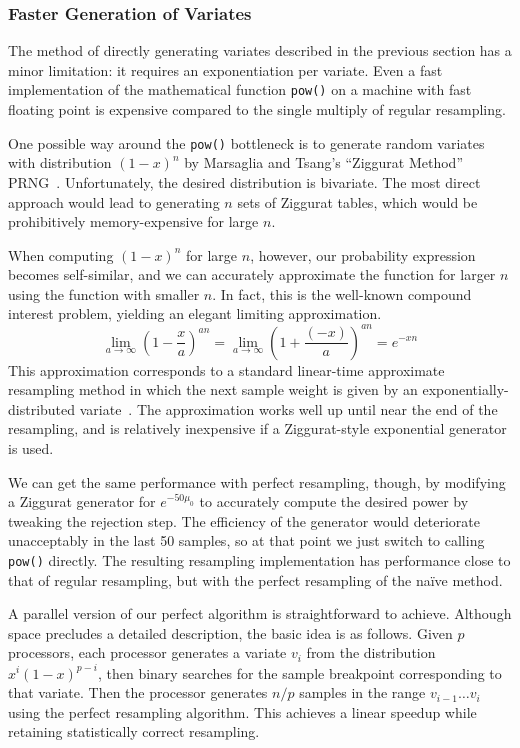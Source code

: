 \documentclass[12pt]{article}
\begin{document}
\subsubsection{Faster Generation of Variates}

  The method of directly generating variates described in the
  previous section has a minor limitation: it requires an
  exponentiation per variate.  Even a fast implementation of
  the mathematical function {\tt pow()} on a machine with
  fast floating point is expensive compared to the single
  multiply of regular resampling.

  One possible way around the {\tt pow()} bottleneck is to generate
  random variates with distribution $(1 - x)^n$ by
  Marsaglia and
  Tsang's ``Ziggurat Method'' PRNG~\cite{ziggurat,ziggurat-fixes}.
  Unfortunately, the desired
  distribution is bivariate.  The most direct
  approach would lead to generating $n$ sets of Ziggurat
  tables, which would be prohibitively memory-expensive for
  large $n$.

  When computing $(1 - x)^n$ for large $n$, however, our
  probability expression becomes self-similar, and we can
  accurately approximate the function for larger $n$ using
  the function with smaller $n$.  In fact, this is the
  well-known compound interest problem, yielding an elegant
  limiting approximation.
 $$
\lim_{a \rightarrow \infty}\left(1 - \frac{x}{a}\right)^{an}
  =   \lim_{a \rightarrow \infty}\left(1 + \frac{(-x)}{a}\right)^{an}
  = e^{-xn}$$  This approximation corresponds to a standard 
  linear-time approximate resampling method in which the next sample
  weight is given by an exponentially-distributed
  variate~\cite{carpenter}.  The approximation works well up until near the
  end of the resampling, and is relatively inexpensive if a
  Ziggurat-style exponential generator is used.

  We can get the same performance with perfect resampling,
  though, by modifying a Ziggurat generator for
  $e^{-50\mu_0}$ to accurately compute the desired power by
  tweaking the rejection step.  The efficiency of the
  generator would deteriorate unacceptably in the last 50
  samples, so at that point we just switch to calling {\tt
  pow()} directly.  The resulting resampling implementation
  has performance close to that of regular resampling, but
  with the perfect resampling of the na\"ive method.

  A parallel version of our perfect algorithm is
  straightforward to achieve. Although space precludes a
  detailed description, the basic idea is as follows.  Given
  $p$ processors, each processor generates a variate $v_i$ from the
  distribution $x^i(1-x)^{p-i}$, then binary searches for
  the sample breakpoint corresponding to that variate.  Then
  the processor generates $n/p$ samples in the range
  $v_{i-1}\ldots v_i$ using the perfect resampling
  algorithm.  This achieves a linear speedup while retaining
  statistically correct resampling.
\end{document}

